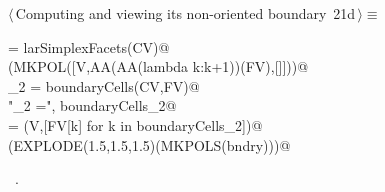 \documentclass[11pt,oneside]{article}	%
\begin{document}
\begin{flushleft} \small
\begin{minipage}{\linewidth} \label{scrap49}
\protect{}$\langle\,$Computing and viewing its non-oriented boundary\nobreak\ {\footnotesize 21d}$\,\rangle\equiv$
\vspace{-1ex}
\begin{list}{}{} \item
\mbox{}\verb@FV = larSimplexFacets(CV)@\\
\mbox{}\verb@VIEW(MKPOL([V,AA(AA(lambda k:k+1))(FV),[]]))@\\
\mbox{}\verb@boundaryCells_2 = boundaryCells(CV,FV)@\\
\mbox{}\verb@print "\nboundaryCells_2 =\n", boundaryCells_2@\\
\mbox{}\verb@bndry = (V,[FV[k] for k in boundaryCells_2])@\\
\mbox{}\verb@VIEW(EXPLODE(1.5,1.5,1.5)(MKPOLS(bndry)))@\\
\mbox{}\verb@@{\NWsep}
\end{list}
\vspace{-1ex}
\footnotesize\addtolength{\baselineskip}{-1ex}
\begin{list}{}{\setlength{\itemsep}{-\parsep}\setlength{\itemindent}{-\leftmargin}}
\item \NWtxtMacroRefIn\ .
\end{list}
\end{minipage}\\[4ex]
\end{flushleft}
\end{document}
